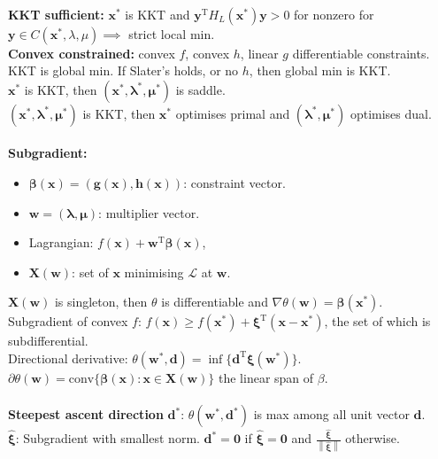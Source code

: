 \documentclass[12pt]{article}
\newcommand{\norm}[1]{\left\lVert#1\right\rVert}
\begin{document}
\begin{multicols*}{3}
        \\
        \textbf{KKT sufficient:} $\bm{x}^*$ is KKT and $\bm{y}^{\mathrm{T}}H_{L}(\bm{x}^*)\bm{y} > 0$ for nonzero for $\bm{y} \in C(\bm{x}^*, \lambda, \mu) \implies$ strict local min. 
        \\
        \textbf{Convex constrained:} convex $f$, convex $h$, linear $g$ differentiable constraints. KKT is global min. If Slater's holds, or no $h$, then global min is KKT.
        \\
        $\bm{x}^*$ is KKT, then $(\bm{x}^*, \bm{\lambda}^*, \bm{\mu}^*)$ is saddle.
        \\
        $(\bm{x}^*, \bm{\lambda}^*, \bm{\mu}^*)$ is KKT, then $\bm{x}^*$ optimises primal and $(\bm{\lambda}^*, \bm{\mu}^*)$ optimises dual.
        \\\\
        \textbf{Subgradient: }
        \begin{itemize}
            \item $\bm{\beta(x)} = (\bm{g(x)}, \bm{h(x)})$: constraint vector.
            \item $\bm{w} = (\bm{\lambda}, \bm{\mu})$: multiplier vector.
            \item Lagrangian: $f(\bm{x}) + \bm{w}^{\mathrm{T}}\bm{\beta(x)}$,
            \item $\bm{X(w)}$: set of $\bm{x}$ minimising $\mathcal{L}$ at $\bm{w}$.
        \end{itemize}
        $\bm{X(w)}$ is singleton, then $\theta$ is differentiable and $\nabla\theta(\bm{w}) = \bm{\beta(x^*)}$.
        \\
        Subgradient of convex $f$: $f(\bm{x}) \geq f(\bm{x}^*) + \bm{\xi}^{\mathrm{T}}(\bm{x - x}^*)$, the set of which is subdifferential.
        \\
        Directional derivative: $\theta(\bm{w}^*, \bm{d}) = \inf\{\bm{d}^{\mathrm{T}}\bm{\xi(\bm{w}^*)}\}$.
        \\
        $\partial\theta(\bm{w}) = \mathrm{conv}\{\bm{\beta(x)} \colon \bm{x} \in \bm{X(w)}\}$ the linear span of $\beta$.
        \\\\
        \textbf{Steepest ascent direction} $\bm{d}^*$: $\theta(\bm{w}^*, \bm{d}^*)$ is max among all unit vector $\bm{d}$.
        \\
        $\hat{\bm{\xi}}$: Subgradient with smallest norm. $\bm{d}^* = \bm{0}$ if $\hat{\bm{\xi}} = \bm{0}$ and $\frac{\hat{\bm{\xi}}}{\norm{\hat{\bm{\xi}}}}$ otherwise.
        \\\\

\end{multicols*}
\end{document}
